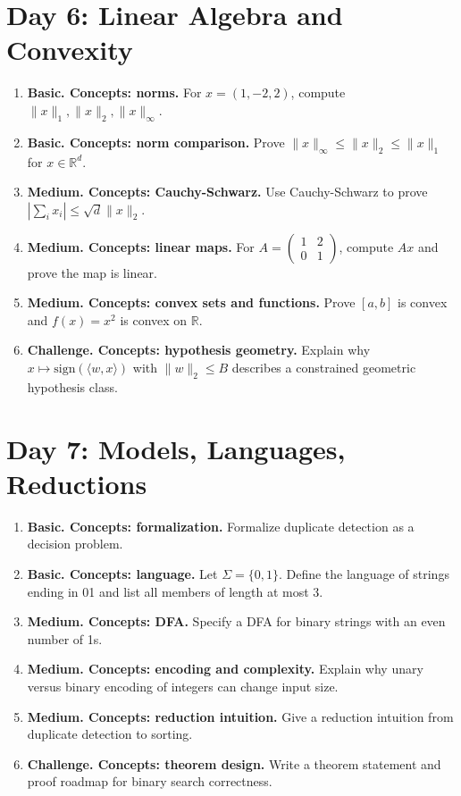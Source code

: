 \documentclass[11pt]{article}
\begin{document}
\section{Day 6: Linear Algebra and Convexity}
\begin{enumerate}[label=\textbf{6.\arabic*.}]
\item \textbf{Basic. Concepts: norms.} For $x=(1,-2,2)$, compute $\|x\|_1,\|x\|_2,\|x\|_\infty$.
\item \textbf{Basic. Concepts: norm comparison.} Prove $\|x\|_\infty\le \|x\|_2\le \|x\|_1$ for $x\in\mathbb{R}^d$.
\item \textbf{Medium. Concepts: Cauchy-Schwarz.} Use Cauchy-Schwarz to prove $|\sum_i x_i|\le\sqrt d\|x\|_2$.
\item \textbf{Medium. Concepts: linear maps.} For $A=\begin{pmatrix}1&2\\0&1\end{pmatrix}$, compute $Ax$ and prove the map is linear.
\item \textbf{Medium. Concepts: convex sets and functions.} Prove $[a,b]$ is convex and $f(x)=x^2$ is convex on $\mathbb{R}$.
\item \textbf{Challenge. Concepts: hypothesis geometry.} Explain why $x\mapsto \mathrm{sign}(\langle w,x\rangle)$ with $\|w\|_2\le B$ describes a constrained geometric hypothesis class.
\end{enumerate}

\section{Day 7: Models, Languages, Reductions}
\begin{enumerate}[label=\textbf{7.\arabic*.}]
\item \textbf{Basic. Concepts: formalization.} Formalize duplicate detection as a decision problem.
\item \textbf{Basic. Concepts: language.} Let $\Sigma=\{0,1\}$. Define the language of strings ending in 01 and list all members of length at most 3.
\item \textbf{Medium. Concepts: DFA.} Specify a DFA for binary strings with an even number of 1s.
\item \textbf{Medium. Concepts: encoding and complexity.} Explain why unary versus binary encoding of integers can change input size.
\item \textbf{Medium. Concepts: reduction intuition.} Give a reduction intuition from duplicate detection to sorting.
\item \textbf{Challenge. Concepts: theorem design.} Write a theorem statement and proof roadmap for binary search correctness.
\end{enumerate}
\end{document}
